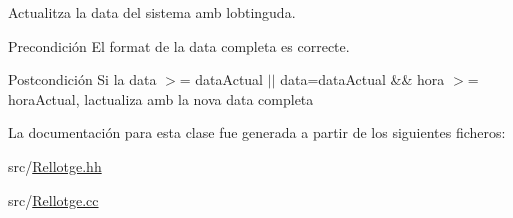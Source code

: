 Actualitza la data del sistema amb l\textquotesingle{}obtinguda. 

\begin{DoxyPrecond}{Precondición}
El format de la data completa es correcte. 
\end{DoxyPrecond}
\begin{DoxyPostcond}{Postcondición}
Si la data $>$= data\+Actual $\vert$$\vert$ data=data\+Actual \&\& hora $>$= hora\+Actual, l\textquotesingle{}actualiza amb la nova data completa 
\end{DoxyPostcond}


La documentación para esta clase fue generada a partir de los siguientes ficheros\+:\begin{DoxyCompactItemize}
\item 
src/\hyperlink{_rellotge_8hh}{Rellotge.\+hh}\item 
src/\hyperlink{_rellotge_8cc}{Rellotge.\+cc}\end{DoxyCompactItemize}
